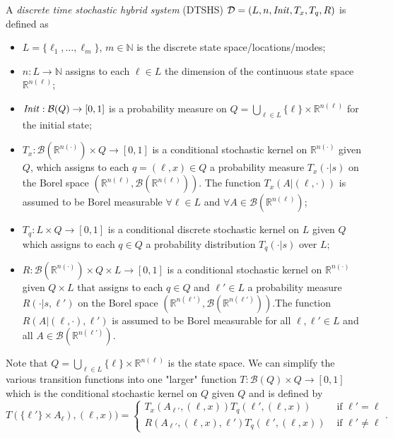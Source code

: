 \begin{defi}
\label{def:DTSHS}
A \emph{discrete time stochastic hybrid system} (DTSHS) $\mathcal{D}=(L,n,\mathit{Init},T_x,T_q,R)$ is defined as
\begin{itemize}
    \item $L=\{\ell_{1},\ldots,\ell_{m}\}$, $m\in\mathbb{N}$ is the discrete state space/locations/modes;
    \item $n:L\rightarrow\mathbb{N}$ assigns to each $\ell\in L$ the dimension of the continuous state space $\mathbb{R}^{n(\ell)}$;

    \item $\mathit{Init}:\mathcal{B}(Q)\rightarrow [0,1]$ is a probability measure on
     $Q=\bigcup_{\ell\in L} \{\ell\}\times\mathbb{R}^{n(\ell)}$ for the initial state;

    \item $T_x:\mathcal{B}(\mathbb{R}^{n(\cdot)})\times Q \rightarrow [0,1]$ is a conditional stochastic kernel on $\mathbb{R}^{n(\cdot)}$ given $Q$, which assigns to each $q=(\ell,x)\in Q$ a probability measure $T_x(\cdot|s)$ on the Borel space $(\mathbb{R}^{n(\ell)},\mathcal{B}(\mathbb{R}^{n(\ell)}))$.
    The function $T_x(A|(\ell,\cdot))$ is assumed to be Borel measurable $\forall \ell\in L$ and $\forall A\in\mathcal{B}(\mathbb{R}^{n(\ell)})$;

    \item $T_q:L\times Q\rightarrow [0,1]$  is a conditional discrete stochastic kernel on $L$ given $Q$ which assigns to each $q\in Q$ a probability distribution $T_q(\cdot|s)$ over $L$;

    \item $R:\mathcal{B}(\mathbb{R}^{n(\cdot)})\times Q\times L\rightarrow[0,1]$ is a conditional stochastic kernel on $\mathbb{R}^{n(\cdot)}$ given $Q\times L$ that assigns to each $q\in Q$ and $\ell'\in L$ a probability measure $R(\cdot | s, \ell')$ on the Borel space
     $(\mathbb{R}^{n(\ell')},\mathcal{B}(\mathbb{R}^{n(\ell')}))$.The function $R(A|(\ell,\cdot),\ell')$  is assumed to be Borel measurable for all $\ell,\ell'\in L$ and all $A\in\mathcal{B}(\mathbb{R}^{n(\ell')})$.
\end{itemize}
\end{defi}
Note that $Q=\bigcup_{\ell\in L} \{\ell\}\times\mathbb{R}^{n(\ell)}$ is the state space.
We can simplify the various transition functions into one "larger" function $T:\mathcal{B}(Q)\times Q\rightarrow [0,1]$ which is the conditional stochastic kernel on $Q$ given $Q$ and is defined by
\[
T(\{\ell'\}\times A_{\ell}), (\ell,x)) =
\begin{cases}
T_{x}(A_{\ell'},(\ell,x))T_{q}(\ell', (\ell,x)) & \text{ if } \ell'=\ell \\
R(A_{\ell'},(\ell,x),\ell')T_{q}(\ell', (\ell,x)) & \text{ if } \ell'\neq\ell
\end{cases}.
\]

